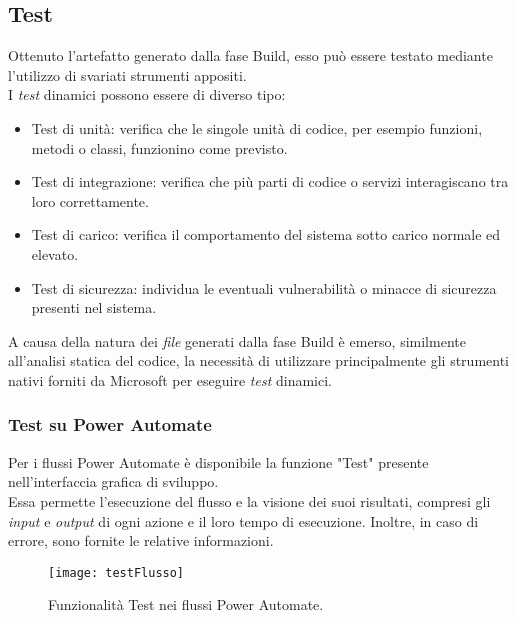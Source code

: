 \subsection{Test}
Ottenuto l'artefatto generato dalla fase Build, esso può essere testato mediante l'utilizzo di svariati strumenti appositi.\\
I \emph{test} dinamici possono essere di diverso tipo: 
\begin{itemize}
    \item Test di unità: verifica che le singole unità di codice, per esempio funzioni, metodi o classi, funzionino come previsto.
    \item Test di integrazione: verifica che più parti di codice o servizi interagiscano tra loro correttamente.
    \item Test di carico: verifica il comportamento del sistema sotto carico normale ed elevato.
    \item Test di sicurezza: individua le eventuali vulnerabilità o minacce di sicurezza presenti nel sistema. 
\end{itemize}

A causa della natura dei \emph{file} generati dalla fase Build è emerso, similmente all'analisi statica del codice, la necessità di utilizzare principalmente gli strumenti nativi forniti da Microsoft per eseguire \emph{test} dinamici.\\

\subsubsection*{Test su Power Automate}
Per i flussi Power Automate è disponibile la funzione "Test" presente nell'interfaccia grafica di sviluppo.\\
Essa permette l'esecuzione del flusso e la visione dei suoi risultati, compresi gli \emph{input} e \emph{output} di ogni azione e il loro tempo di esecuzione. 
Inoltre, in caso di errore, sono fornite le relative informazioni. 
\begin{figure}[htbp] 
    \centering 
    \texttt{[image: testFlusso]} 
    \caption{Funzionalità Test nei flussi Power Automate.}
    \label{fig:testFlusso}
\end{figure}

